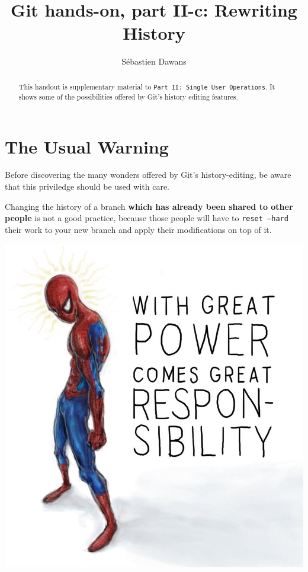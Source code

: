\documentclass{../../common/tufte-latex/tufte-handout}
\title{Git hands-on, part II-c: Rewriting History}
\author{S\'ebastien Dawans}
\begin{document}
\maketitle%

\begin{abstract}
\noindent
This handout is supplementary material to \texttt{Part II: Single User Operations}. It shows some of the possibilities offered by Git's history editing features.
\end{abstract}

\section{The Usual Warning}

Before discovering the many wonders offered by Git's history-editing, be aware that this priviledge should be used with care.

Changing the history of a branch \textbf{which has already been shared to other people} is not a good practice, because those people will have to \texttt{reset --hard} their work to your new branch and apply their modifications on top of it.

\begin{marginfigure}%
  \centering
  \includegraphics[width=\linewidth]{spiderman.jpg}
  \label{fig:spiderman}
\end{marginfigure}
\end{document}
